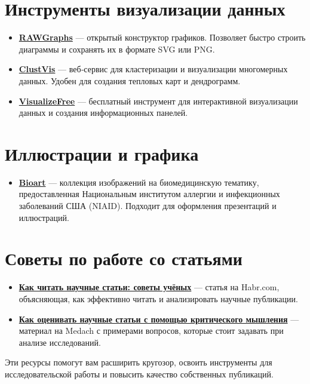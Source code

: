 \documentclass[
  russian,
  letterpaper,
]{book}
\providecommand{\tightlist}{%
  \setlength{\itemsep}{0pt}\setlength{\parskip}{0pt}}
\begin{document}
\chapter{Инструменты визуализации
данных}\label{ux438ux43dux441ux442ux440ux443ux43cux435ux43dux442ux44b-ux432ux438ux437ux443ux430ux43bux438ux437ux430ux446ux438ux438-ux434ux430ux43dux43dux44bux445}

\begin{itemize}
\tightlist
\item
  \href{https://rawgraphs.io}{\textbf{RAWGraphs}} --- открытый
  конструктор графиков. Позволяет быстро строить диаграммы и сохранять
  их в формате SVG или PNG.
\item
  \href{https://biit.cs.ut.ee/clustvis/}{\textbf{ClustVis}} ---
  веб‑сервис для кластеризации и визуализации многомерных данных. Удобен
  для создания тепловых карт и дендрограмм.
\item
  \href{https://visualizefree.com}{\textbf{VisualizeFree}} ---
  бесплатный инструмент для интерактивной визуализации данных и создания
  информационных панелей.
\end{itemize}

\chapter{Иллюстрации и
графика}\label{ux438ux43bux43bux44eux441ux442ux440ux430ux446ux438ux438-ux438-ux433ux440ux430ux444ux438ux43aux430}

\begin{itemize}
\tightlist
\item
  \href{https://www.flickr.com/photos/niaid/}{\textbf{Bioart}} ---
  коллекция изображений на биомедицинскую тематику, предоставленная
  Национальным институтом аллергии и инфекционных заболеваний США
  (NIAID). Подходит для оформления презентаций и иллюстраций.
\end{itemize}

\chapter{Советы по работе со
статьями}\label{ux441ux43eux432ux435ux442ux44b-ux43fux43e-ux440ux430ux431ux43eux442ux435-ux441ux43e-ux441ux442ux430ux442ux44cux44fux43cux438}

\begin{itemize}
\item
  \href{https://habr.com/ru/post/example/}{\textbf{Как читать научные
  статьи: советы учёных}} --- статья на Habr.com, объясняющая, как
  эффективно читать и анализировать научные публикации.
\item
  \href{https://medach.pro/post/example}{\textbf{Как оценивать научные
  статьи с помощью критического мышления}} --- материал на Medach с
  примерами вопросов, которые стоит задавать при анализе исследований.
\end{itemize}

Эти ресурсы помогут вам расширить кругозор, освоить инструменты для
исследовательской работы и повысить качество собственных публикаций.


\backmatter
\end{document}
